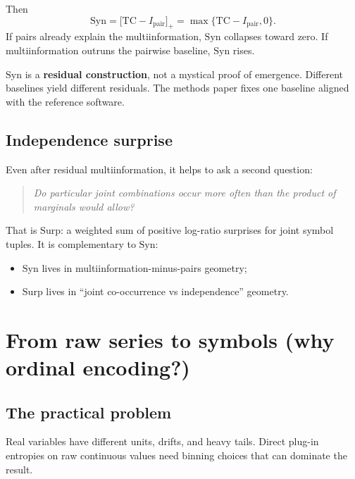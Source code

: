 \documentclass[11pt,a4paper]{article}
\begin{document}
Then
\begin{equation}
\mathrm{Syn}
=
\bigl[\mathrm{TC}-I_{\mathrm{pair}}\bigr]_+
=
\max\{\mathrm{TC}-I_{\mathrm{pair}},0\}.
\end{equation}
If pairs already explain the multiinformation, $\mathrm{Syn}$ collapses
toward zero. If multiinformation outruns the pairwise baseline,
$\mathrm{Syn}$ rises.

\begin{warningbox}
$\mathrm{Syn}$ is a \textbf{residual construction}, not a mystical proof of
emergence. Different baselines yield different residuals. The methods paper
fixes one baseline aligned with the reference software.
\end{warningbox}

\subsection{Independence surprise}

Even after residual multiinformation, it helps to ask a second question:
\begin{quote}
\emph{Do particular joint combinations occur more often than the product of
marginals would allow?}
\end{quote}
That is $\mathrm{Surp}$: a weighted sum of positive log-ratio surprises for
joint symbol tuples. It is complementary to $\mathrm{Syn}$:
\begin{itemize}[leftmargin=*,itemsep=2pt]
  \item $\mathrm{Syn}$ lives in multiinformation-minus-pairs geometry;
  \item $\mathrm{Surp}$ lives in ``joint co-occurrence vs independence''
  geometry.
\end{itemize}

\section{From raw series to symbols (why ordinal encoding?)}
\label{sec:symbols}

\subsection{The practical problem}

Real variables have different units, drifts, and heavy tails. Direct
plug-in entropies on raw continuous values need binning choices that can
dominate the result.
\end{document}
